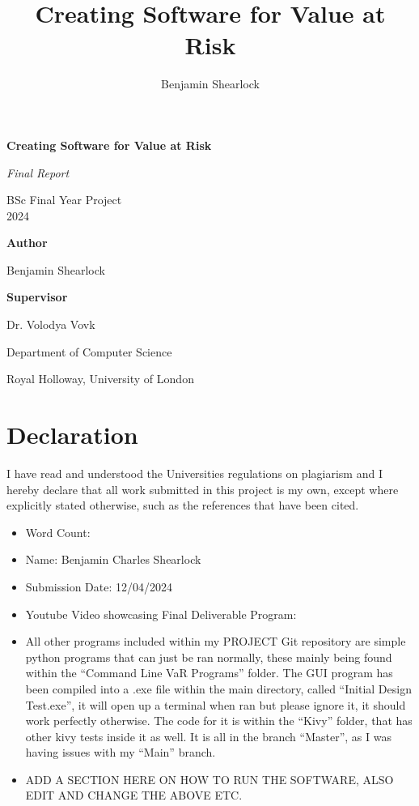 \documentclass{article}
\title{Creating Software for Value at Risk}
\author{Benjamin Shearlock}
\begin{document}
\raggedright

\begin{titlepage}
  \begin{center}
    \vspace*{1cm}
    {\LARGE \textbf{Creating Software for Value at Risk} \par} 
    \vspace{1.5cm}
    {\Large \textit{Final Report} \par}
    \vspace{0.5cm}
    {\Large BSc Final Year Project \\ 2024 \par}
    \vspace{2cm}
    {\large \textbf{Author} \par}
    {\large Benjamin Shearlock \par}
    \vspace{2cm}
    {\large \textbf{Supervisor} \par}
    {\large Dr. Volodya Vovk \par}
    \vfill
    {\large Department of Computer Science \par}
    {\large Royal Holloway, University of London \par}
  \end{center}
\end{titlepage}

\setlength{\parindent}{0pt}

\section*{Declaration}
I have read and understood the Universities regulations on plagiarism and I hereby declare that all work submitted in this project is my own, except where explicitly stated otherwise, such as the references that have been cited. \\

\begin{itemize}
  \item Word Count:
  \item Name: Benjamin Charles Shearlock
  \item Submission Date: 12/04/2024
  \item Youtube Video showcasing Final Deliverable Program: \url{}
  \item All other programs included within my PROJECT Git repository are simple python programs that can just be ran normally, these mainly being found within the ``Command Line VaR Programs'' folder. The GUI program has been compiled into a .exe file within the main directory, called “Initial Design Test.exe”, it will open up a terminal when ran but please ignore it, it should work perfectly otherwise. The code for it is within the ``Kivy'' folder, that has other kivy tests inside it as well. It is all in the branch ``Master'', as I was having issues with my ``Main'' branch.
  \item ADD A SECTION HERE ON HOW TO RUN THE SOFTWARE, ALSO EDIT AND CHANGE THE ABOVE ETC.


\end{itemize}
\end{document}

